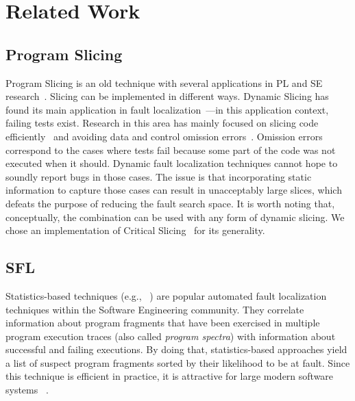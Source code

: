 \documentclass{article}
\begin{document}
\section{Related Work}


\subsection{Program Slicing}

Program Slicing is an old technique with several applications in PL
and SE research~\cite{Weiser:1981:PS:800078.802557}. Slicing can be
implemented in different ways. Dynamic Slicing has found its main
application in fault
localization~\cite{Agrawal:1990:DPS:93542.93576}---in this application
context, failing tests exist. Research in this area has mainly focused
on slicing code
efficiently~\cite{Wang:2008:DSJ:1330017.1330021,Wang:2004:UCB:998675.999455}
and avoiding data and control omission
errors~\cite{Zhang:2007:TLE:1250734.1250782,Lin:2018:BDE:3238147.3238163}. Omission errors correspond to the
cases where tests fail because some part of the code was not executed
when it should. Dynamic fault localization techniques cannot hope to
soundly report bugs in those cases. The issue is that incorporating
static information to capture those cases can result in unacceptably
large slices, which defeats the purpose of reducing the fault search
space. It is worth noting that, conceptually, the \comb{} combination
can be used with any form of dynamic slicing. We chose an
implementation of Critical
Slicing~\cite{DeMillo:1996:CSS:229000.226310} for its generality.



\subsection{SFL}

Statistics-based techniques (e.g., ~\cite{Pearson:2017:EIF:3097368.3097441}) are
popular automated fault localization techniques within the Software Engineering
community. They correlate information about program fragments that have been
exercised in multiple program execution traces (also called \textit{program
spectra}) with information about successful and failing executions. By doing
that, statistics-based approaches yield a list of suspect program fragments
sorted by their likelihood to be at fault. Since this technique is efficient in
practice, it is attractive for large modern software systems ~\cite{Zoeteweij:2007:DES:1251988.1253298}.
\end{document}
